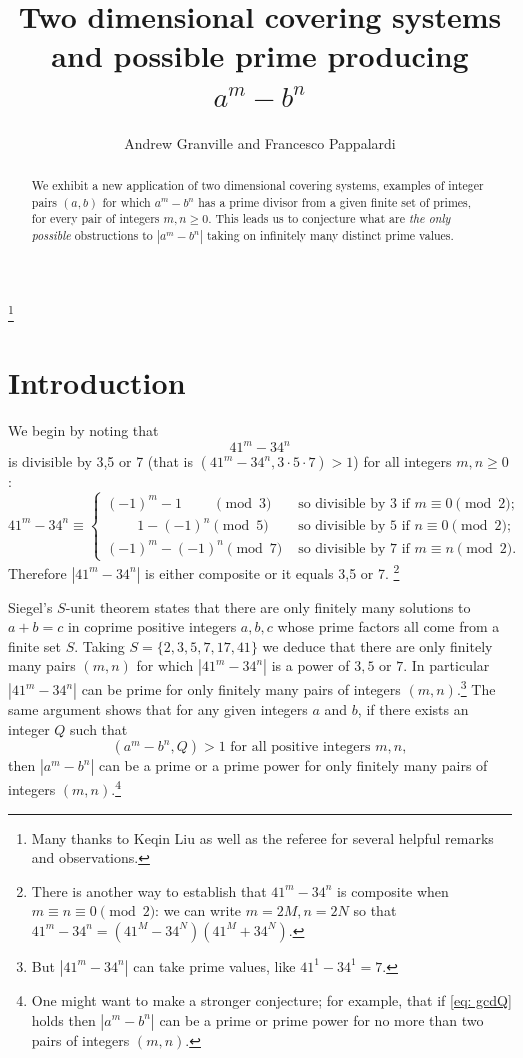 \documentclass[12pt, a4paper,  reqno, english]{amsart}%
\numberwithin{equation}{section}
\theoremstyle{definition}
\renewcommand{\geq}{\geqslant}
\begin{document}
\title{Two dimensional covering systems and possible prime producing $a^m-b^n$} 
\author{Andrew Granville and Francesco Pappalardi}
\thanks{Many thanks to Keqin Liu as well as the referee for several helpful remarks and observations.}
 
\begin{abstract}  We exhibit a new application of two dimensional covering systems,  examples of integer pairs $(a,b)$ for which $a^m-b^n$ has a prime divisor from a given finite set of primes, for every pair of integers $m,n\geq 0$.    This leads us to conjecture what are \emph{the only possible} obstructions  to $|a^m-b^n|$ taking on infinitely many distinct prime values.
\end{abstract}
\maketitle

\section{Introduction}
 
 We begin by noting that 
 \[
 41^m-34^n
 \] 
 is divisible by 3,5 or 7  (that is $(41^m-34^n,3\cdot 5\cdot 7)>1$) for all integers $m,n\geq 0$:
 \[
 41^m-34^n\equiv
 \begin{cases}
 (-1)^m-1 \qquad \ \pmod 3 &\text{ so divisible by 3 if } m\equiv 0 \pmod 2;\\
\qquad \  1- (-1)^n \pmod 5 &\text{ so divisible by 5 if } n\equiv 0 \pmod 2;\\
   (-1)^m-(-1)^n \pmod 7 &\text{ so divisible by 7 if } m\equiv n\pmod 2.
 \end{cases}
 \]
Therefore $|41^m-34^n|$ is either composite or it equals  3,5 or 7. 
\footnote{There is another way to  establish that $ 41^m-34^n$ is composite when $m\equiv n\equiv 0\pmod 2$: we can write
 $m=2M, n=2N$ so that $41^m-34^n=(41^M-34^N)(41^M+34^N)$. }

 Siegel's $S$-unit theorem \cite{Sg2} states that there are only finitely many solutions to $a+b=c$ in coprime positive integers $a,b,c$ whose prime factors all come from a finite set $S$. Taking $S=\{ 2,3,5,7,17,41\}$ we deduce that there are only finitely many pairs $(m,n)$ for which $|41^m-34^n|$ is a power of $3,5$ or $7$. In particular $|41^m-34^n|$ can be prime for only finitely many pairs of integers $(m,n)$.\footnote{But $|41^m-34^n|$ can take prime values,   like $41^1-34^1=7$.}
 The same argument shows that for any given integers $a$ and $b$, if there exists an integer $Q$ such that 
\begin{equation} \label{eq: gcdQ}
(a^m-b^n , Q)>1 \text{ for all  positive integers } m,n ,
\end{equation}
then $|a^m-b^n|$ can be a prime or a prime power for only finitely many pairs of integers $(m,n)$.\footnote{One might want to make a stronger conjecture; for example, that if  \eqref{eq: gcdQ}  holds then $|a^m-b^n|$ can be a prime or prime power for no more than two pairs of integers $(m,n)$.}
\end{document}
